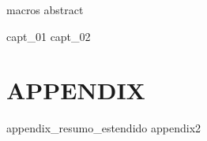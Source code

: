 \documentclass[12pt,a4paper,oneside,english]{book}
\begin{document}




\runfrontend{}

{macros}
{abstract}

\sumario

\listadefiguras

\listadetabelas


	\listadesimbolos

	\listadeacronimos

	\listadenotacoes

\markboth{}{}

\mainmatter 
\setcounter{page}{1} \pagestyle{plain} 

{capt_01}
{capt_02}



%
% 
%


\part*{APPENDIX}
\appendix
{appendix_resumo_estendido}
{appendix2}
\end{document}
